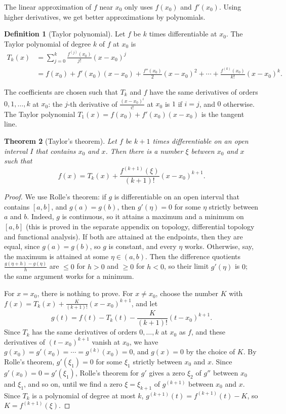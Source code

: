 \documentclass[11pt]{article}
\theoremstyle{definition}
\newtheorem{definition}{Definition}[section]
\theoremstyle{plain}
\newtheorem{theorem}[definition]{Theorem}
\theoremstyle{remark}
\begin{document}
The linear approximation of $f$ near $x_0$ only uses $f(x_0)$ and $f'(x_0)$. Using higher derivatives, we get better approximations by polynomials.

\begin{definition}[Taylor polynomial]\label{def:taylor-polynomial}
    Let $f$ be $k$ times differentiable at $x_0$. The Taylor polynomial of degree $k$ of $f$ at $x_0$ is
    \begin{align*}
        T_k(x) &= \sum_{j=0}^k \frac{f^{(j)}(x_0)}{j!} (x - x_0)^j \\
        &= f(x_0) + f'(x_0)(x - x_0) + \frac{f''(x_0)}{2}(x - x_0)^2 + \cdots + \frac{f^{(k)}(x_0)}{k!}(x - x_0)^k.
    \end{align*}
\end{definition}

The coefficients are chosen such that $T_k$ and $f$ have the same derivatives of orders $0, 1, \ldots, k$ at $x_0$: the $j$-th derivative of $\frac{(x - x_0)^i}{i!}$ at $x_0$ is $1$ if $i = j$, and $0$ otherwise. The Taylor polynomial $T_1(x) = f(x_0) + f'(x_0)(x - x_0)$ is the tangent line.

\begin{theorem}[Taylor's theorem]\label{thm:taylor-1d}
    Let $f$ be $k + 1$ times differentiable on an open interval $I$ that contains $x_0$ and $x$. Then there is a number $\xi$ between $x_0$ and $x$ such that
    \[f(x) = T_k(x) + \frac{f^{(k+1)}(\xi)}{(k+1)!} (x - x_0)^{k+1}.\]
\end{theorem}

\begin{proof}
    We use Rolle's theorem: if $g$ is differentiable on an open interval that contains $[a, b]$, and $g(a) = g(b)$, then $g'(\eta) = 0$ for some $\eta$ strictly between $a$ and $b$. Indeed, $g$ is continuous, so it attains a maximum and a minimum on $[a, b]$ (this is proved in the separate appendix on topology, differential topology and functional analysis). If both are attained at the endpoints, then they are equal, since $g(a) = g(b)$, so $g$ is constant, and every $\eta$ works. Otherwise, say, the maximum is attained at some $\eta \in (a, b)$. Then the difference quotients $\frac{g(\eta + h) - g(\eta)}{h}$ are $\leq 0$ for $h > 0$ and $\geq 0$ for $h < 0$, so their limit $g'(\eta)$ is $0$; the same argument works for a minimum.

    For $x = x_0$, there is nothing to prove. For $x \neq x_0$, choose the number $K$ with $f(x) = T_k(x) + \frac{K}{(k+1)!}(x - x_0)^{k+1}$, and let
    \[g(t) = f(t) - T_k(t) - \frac{K}{(k+1)!}(t - x_0)^{k+1}.\]
    Since $T_k$ has the same derivatives of orders $0, \ldots, k$ at $x_0$ as $f$, and these derivatives of $(t - x_0)^{k+1}$ vanish at $x_0$, we have $g(x_0) = g'(x_0) = \cdots = g^{(k)}(x_0) = 0$, and $g(x) = 0$ by the choice of $K$. By Rolle's theorem, $g'(\xi_1) = 0$ for some $\xi_1$ strictly between $x_0$ and $x$. Since $g'(x_0) = 0 = g'(\xi_1)$, Rolle's theorem for $g'$ gives a zero $\xi_2$ of $g''$ between $x_0$ and $\xi_1$, and so on, until we find a zero $\xi = \xi_{k+1}$ of $g^{(k+1)}$ between $x_0$ and $x$. Since $T_k$ is a polynomial of degree at most $k$, $g^{(k+1)}(t) = f^{(k+1)}(t) - K$, so $K = f^{(k+1)}(\xi)$.
\end{proof}
\end{document}

